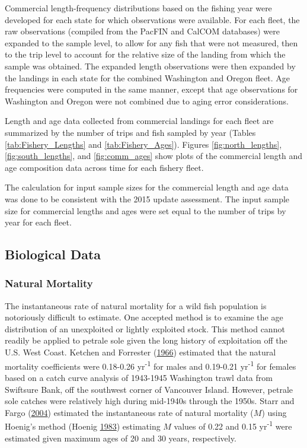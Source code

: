 \documentclass[12pt,]{article}
\begin{document}
Commercial length-frequency distributions based on the fishing year were
developed for each state for which observations were available. For each
fleet, the raw observations (compiled from the PacFIN and CalCOM
databases) were expanded to the sample level, to allow for any fish that
were not measured, then to the trip level to account for the relative
size of the landing from which the sample was obtained. The expanded
length observations were then expanded by the landings in each state for
the combined Washington and Oregon fleet. Age frequencies were computed
in the same manner, except that age observations for Washington and
Oregon were not combined due to aging error considerations.

Length and age data collected from commercial landings for each fleet
are summarized by the number of trips and fish sampled by year (Tables
\ref{tab:Fishery_Lengths} and \ref{tab:Fishery_Ages}). Figures
\ref{fig:north_lengths}, \ref{fig:south_lengths}, and
\ref{fig:comm_ages} show plots of the commercial length and age
composition data across time for each fishery fleet.

The calculation for input sample sizes for the commercial length and age
data was done to be consistent with the 2015 update assessment. The
input sample size for commercial lengths and ages were set equal to the
number of trips by year for each fleet.

\subsection{Biological Data}\label{biological-data}

\subsubsection{Natural Mortality}\label{natural-mortality}

The instantaneous rate of natural mortality for a wild fish population
is notoriously difficult to estimate. One accepted method is to examine
the age distribution of an unexploited or lightly exploited stock. This
method cannot readily be applied to petrale sole given the long history
of exploitation off the U.S. West Coast. Ketchen and Forrester
(\protect\hyperlink{ref-ketchen_population_1966}{1966}) estimated that
the natural mortality coefficients were 0.18-0.26 yr\textsuperscript{-1}
for males and 0.19-0.21 yr\textsuperscript{-1} for females based on a
catch curve analysis of 1943-1945 Washington trawl data from Swiftsure
Bank, off the southwest corner of Vancouver Island. However, petrale
sole catches were relatively high during mid-1940s through the 1950s.
Starr and Fargo (\protect\hyperlink{ref-starr_petrale_2004}{2004})
estimated the instantaneous rate of natural mortality (\(M\)) using
Hoenig's method (Hoenig
\protect\hyperlink{ref-hoenig_empirical_1983}{1983}) estimating \(M\)
values of 0.22 and 0.15 yr\textsuperscript{-1} were estimated given
maximum ages of 20 and 30 years, respectively.
\end{document}
